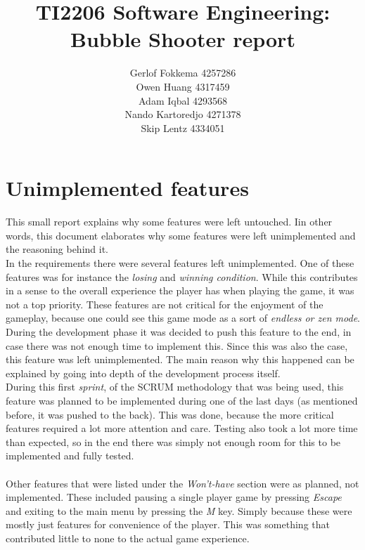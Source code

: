 \documentclass[a4paper,11pt]{article}
\title{TI2206 Software Engineering: Bubble Shooter report}
\author{Gerlof Fokkema 4257286 \\
	Owen Huang 4317459 \\
	Adam Iqbal 4293568 \\
	Nando Kartoredjo 4271378 \\
	Skip Lentz 4334051 \\
}
\begin{document}
\maketitle

\newpage
\section*{Unimplemented features}
This small report explains why some features were left untouched. Iin other words, this document elaborates why some features were left unimplemented and the reasoning behind it. \\
\noindent
In the requirements there were several features left unimplemented. One of these features was for instance the \textit{losing} and \textit{winning condition}.
While this contributes in a sense to the overall experience the player has when playing the game, it was not a top priority. These features are not critical for the enjoyment of the gameplay, because one could see this game mode as a sort of \textit{endless or zen mode}. During the development phase it was decided to push this feature to the end, in case there was not enough time to implement this. Since this was also the case, this feature was left unimplemented. The main reason why this happened can be explained by going into depth of the development process itself. \\
\indent During this first \textit{sprint}, of the SCRUM methodology that was being used, this feature was planned to be implemented during one of the last days (as mentioned before, it was pushed to the back). This was done, because the more critical features required a lot more attention and care. Testing also took a lot more time than expected, so in the end there was simply not enough room for this to be implemented and fully tested. \\\\
\noindent
Other features that were listed under the \textit{Won't-have} section were as planned, not implemented. These included pausing a single player game by pressing \textit{Escape} and exiting to the main menu by pressing the \textit{M} key.  Simply because these were mostly just features for convenience of the player. This was something that contributed little to none to the actual game experience.
\end{document}
